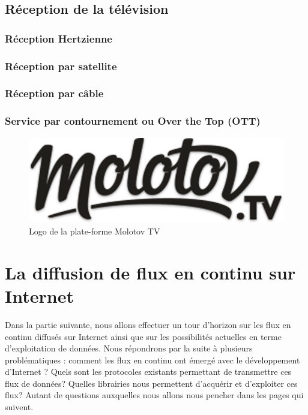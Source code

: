 \documentclass{polytech/polytech}
\begin{document}
\section{Réception de la télévision}

\subsection{Réception Hertzienne}

\subsection{Réception par satellite}

\subsection{Réception par câble}

\subsection{Service par contournement ou Over the Top (OTT)}


\begin{figure}
	\includegraphics[scale=0.35]{images/logoMolotov}
	\caption{Logo de la plate-forme Molotov TV}
	\label{fig:logoMolotov}
\end{figure}

\chapter{La diffusion de flux en continu sur Internet}
\label{chap:diffusion_flux}

Dans la partie suivante, nous allons effectuer un tour d’horizon sur les flux en continu diffusés sur Internet ainsi que sur les possibilités actuelles en terme d’exploitation de données. Nous répondrons par la suite à plusieurs problématiques : comment les flux en continu ont émergé avec le développement d’Internet ? Quels sont les protocoles existants permettant de transmettre ces flux de données? Quelles librairies nous permettent d’acquérir et d’exploiter ces flux? Autant de questions auxquelles nous allons nous pencher dans les pages qui suivent.
\end{document}
